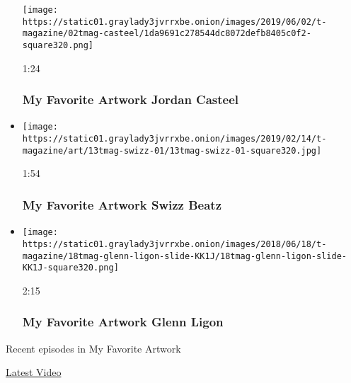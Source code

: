 \begin{itemize}
  \texttt{[image: https://static01.graylady3jvrrxbe.onion/images/2019/06/02/t-magazine/02tmag-casteel/1da9691c278544dc8072defb8405c0f2-square320.png]}

  1:24

  \hypertarget{my-favorite-artwork--jordan-casteel}{%
  \subsubsection{My Favorite Artwork \textbar{} Jordan
  Casteel}\label{my-favorite-artwork--jordan-casteel}}
\item
  \href{https://www.nytimes3xbfgragh.onion/video/t-magazine/art/100000006354043/swizz-beatz-jordan-casteel.html?action=click\&module=video-series-bar\&region=header\&pgtype=Article\&playlistId=video/my-favorite-artwork}{}

  \texttt{[image: https://static01.graylady3jvrrxbe.onion/images/2019/02/14/t-magazine/art/13tmag-swizz-01/13tmag-swizz-01-square320.jpg]}

  1:54

  \hypertarget{my-favorite-artwork--swizz-beatz}{%
  \subsubsection{My Favorite Artwork \textbar{} Swizz
  Beatz}\label{my-favorite-artwork--swizz-beatz}}
\item
  \href{https://www.nytimes3xbfgragh.onion/video/t-magazine/100000005951066/my-favorite-artwork-glenn-ligon.html?action=click\&module=video-series-bar\&region=header\&pgtype=Article\&playlistId=video/my-favorite-artwork}{}

  \texttt{[image: https://static01.graylady3jvrrxbe.onion/images/2018/06/18/t-magazine/18tmag-glenn-ligon-slide-KK1J/18tmag-glenn-ligon-slide-KK1J-square320.png]}

  2:15

  \hypertarget{my-favorite-artwork--glenn-ligon}{%
  \subsubsection{My Favorite Artwork \textbar{} Glenn
  Ligon}\label{my-favorite-artwork--glenn-ligon}}
\end{itemize}

Recent episodes in My Favorite Artwork

\href{/video}{}

\href{/video/latest-video}{Latest Video}

